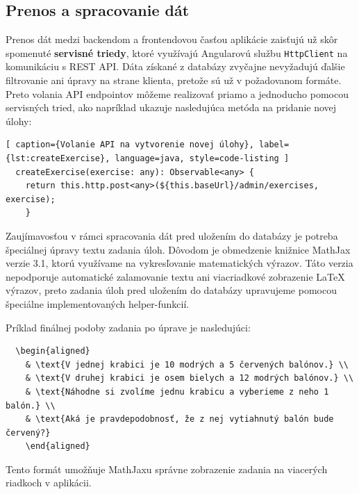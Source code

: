  
 

\subsection{Prenos a spracovanie dát}

Prenos dát medzi backendom a frontendovou časťou aplikácie zaisťujú už skôr spomenuté \textbf{servisné triedy}, ktoré využívajú Angularovú službu \texttt{HttpClient} na komunikáciu s REST API.
 Dáta získané z databázy zvyčajne nevyžadujú ďalšie filtrovanie ani úpravy na strane klienta, pretože sú už v požadovanom formáte.
  Preto volania API endpointov môžeme realizovať priamo a jednoducho pomocou servisných tried, ako napríklad ukazuje nasledujúca metóda na pridanie novej úlohy:

\begin{lstlisting}[ caption={Volanie API na vytvorenie novej úlohy}, label={lst:createExercise}, language=java, style=code-listing ] 
  createExercise(exercise: any): Observable<any> { 
    return this.http.post<any>(${this.baseUrl}/admin/exercises, exercise); 
    } 
  \end{lstlisting}

Zaujímavosťou v rámci spracovania dát pred uložením do databázy je potreba špeciálnej úpravy textu zadania úloh. 
Dôvodom je obmedzenie knižnice MathJax verzie 3.1, ktorú využívame na vykresľovanie matematických výrazov. 
Táto verzia nepodporuje automatické zalamovanie textu ani viacriadkové zobrazenie LaTeX výrazov, preto zadania úloh pred uložením do databázy upravujeme pomocou špeciálne implementovaných helper-funkcií.

Príklad finálnej podoby zadania po úprave je nasledujúci:
\begin{verbatim}
  \begin{aligned}
    & \text{V jednej krabici je 10 modrých a 5 červených balónov.} \\
    & \text{V druhej krabici je osem bielych a 12 modrých balónov.} \\
    & \text{Náhodne si zvolíme jednu krabicu a vyberieme z neho 1 balón.} \\
    & \text{Aká je pravdepodobnosť, že z nej vytiahnutý balón bude červený?}
    \end{aligned}
\end{verbatim}
Tento formát umožňuje MathJaxu správne zobrazenie zadania na viacerých riadkoch v aplikácii.

